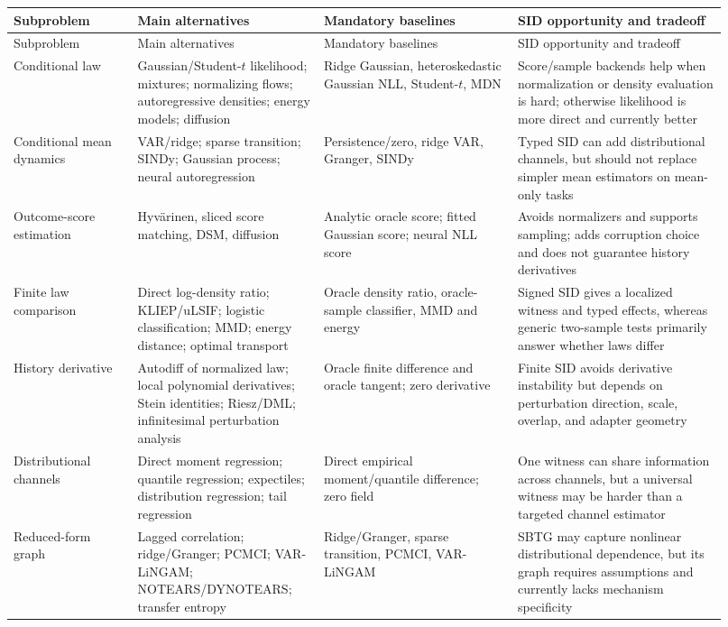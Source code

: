\documentclass[10pt]{article}
\begin{document}
\begin{longtable}{@{}p{0.16\linewidth}p{0.24\linewidth}p{0.25\linewidth}p{0.27\linewidth}@{}}
\toprule
Subproblem & Main alternatives & Mandatory baselines & SID opportunity and tradeoff \\
\midrule
\endfirsthead
\toprule
Subproblem & Main alternatives & Mandatory baselines & SID opportunity and tradeoff \\
\midrule
\endhead
Conditional law & Gaussian/Student-\(t\) likelihood; mixtures; normalizing flows; autoregressive densities; energy models; diffusion & Ridge Gaussian, heteroskedastic Gaussian NLL, Student-\(t\), MDN & Score/sample backends help when normalization or density evaluation is hard; otherwise likelihood is more direct and currently better \\
Conditional mean dynamics & VAR/ridge; sparse transition; SINDy; Gaussian process; neural autoregression & Persistence/zero, ridge VAR, Granger, SINDy & Typed SID can add distributional channels, but should not replace simpler mean estimators on mean-only tasks \\
Outcome-score estimation & Hyv\"arinen, sliced score matching, DSM, diffusion & Analytic oracle score; fitted Gaussian score; neural NLL score & Avoids normalizers and supports sampling; adds corruption choice and does not guarantee history derivatives \\
Finite law comparison & Direct log-density ratio; KLIEP/uLSIF; logistic classification; MMD; energy distance; optimal transport & Oracle density ratio, oracle-sample classifier, MMD and energy & Signed SID gives a localized witness and typed effects, whereas generic two-sample tests primarily answer whether laws differ \\
History derivative & Autodiff of normalized law; local polynomial derivatives; Stein identities; Riesz/DML; infinitesimal perturbation analysis & Oracle finite difference and oracle tangent; zero derivative & Finite SID avoids derivative instability but depends on perturbation direction, scale, overlap, and adapter geometry \\
Distributional channels & Direct moment regression; quantile regression; expectiles; distribution regression; tail regression & Direct empirical moment/quantile difference; zero field & One witness can share information across channels, but a universal witness may be harder than a targeted channel estimator \\
Reduced-form graph & Lagged correlation; ridge/Granger; PCMCI; VAR-LiNGAM; NOTEARS/DYNOTEARS; transfer entropy & Ridge/Granger, sparse transition, PCMCI, VAR-LiNGAM & SBTG may capture nonlinear distributional dependence, but its graph requires assumptions and currently lacks mechanism specificity \\

\end{longtable}
\end{document}
